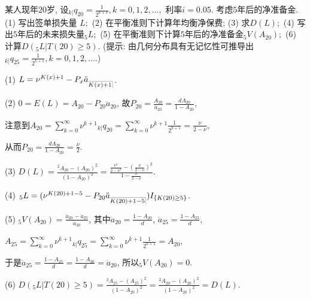 \documentclass[lang=cn,10pt]{elegantbook}
\makeatletter
\DeclareRobustCommand{\annu}[1]{_{%
    \def\arraystretch{0}%
    \setlength\arraycolsep{1pt}%
    \setlength\arrayrulewidth{.2pt}%
    \begin{array}[b]{@{}c|}\hline
        \\[\arraycolsep]%
        \scriptstyle #1%
    \end{array}%
}}
\makeatother
\begin{document}
\begin{example}\label{l5.2}某人现年$20$岁, 设${}_{k|}q_{20}=\frac{1}{2^{k+1}},k=0,1,2,...,$ 利率$i=0.05.$ 考虑$5$年后的净准备金. (1) 写出签单损失量 $L;$ (2) 在平衡准则下计算年均衡净保费; (3) 求$D(L);$ (4) 写出$5$年后的未来损失量$_{5}L;$ (5) 在平衡准则下计算$5$年后的净准备金${}_{5}V( A_{20});$ (6) 计算$D({}_{5}L|T(20)\geq 5).$ (提示: 由几何分布具有无记忆性可推导出${}_{k|}q_{25}=\frac{1}{2^{k+1}},k=0,1,2,....$)
\end{example}
\begin{solution}
(1) $L = \nu^{K(x)+1} - P_x\ddot{a}_{\annu{K(x)+1}}$.

(2) $0=E(L)=A_{20}-P_{20}\ddot{a}_{20}$, 故$P_{20}=\frac{A_{20}}{\ddot{a}_{20}} = \frac{dA_{20}}{1-A_{20}}$,

注意到$A_{20}=\sum_{k=0}^{\infty}\nu^{k+1}{}_{k|}q_{20} = \sum_{k=0}^{\infty}\nu^{k+1}\frac{1}{2^{k+1}} = \frac{\nu}{2-\nu}$,

从而$P_{20}=\frac{dA_{20}}{1-A_{20}}=\frac{\nu}{2}.$

(3) $D(L)=\frac{^2A_{20}-(A_{20})^2}{(1-A_{20})^2}=\frac{\frac{\nu^{2}}{2-\nu^{2}}-\left(\frac{\nu}{2-\nu}\right)^{2}}{1-\frac{\nu}{2-\nu}}$.

(4) ${}_{5}L= (\nu^{K(20)+1-5}-P_{20}\ddot{a}_{\annu{K(20)+1-5}} )I_{\{K(20)\geq 5\}}$.

(5) ${}_{5}V(A_{20})=\frac{\ddot{a}_{20}-\ddot{a}_{25}}{\ddot{a}_{20}}$, 其中$\ddot{a}_{20}=\frac{1-A_{20}}{d}$, $\ddot{a}_{25}=\frac{1-A_{25}}{d}$,

$A_{25}=\sum_{k=0}^{\infty}\nu^{k+1}{}_{k|}q_{25} = \sum_{k=0}^{\infty}\nu^{k+1}\frac{1}{2^{k+1}} = A_{20}$,

于是$\ddot{a}_{25}=\frac{1-A_{25}}{d} = \frac{1-A_{20}}{d} = \ddot{a}_{20}$, 所以${}_{5}V(A_{20})=0$.

(6) $D({}_{5}L|T(20)\geq 5)=\frac{^2A_{25}-(A_{25})^2}{(1-A_{20})^2} = \frac{^2A_{20}-(A_{20})^2}{(1-A_{20})^2} = D(L)$.
\end{solution}
\end{document}
